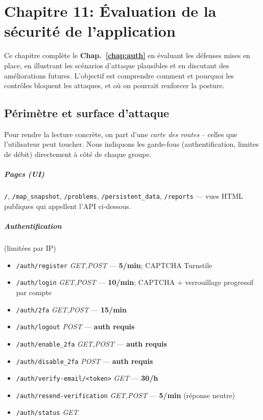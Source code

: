 \chapter{Chapitre 11: Évaluation de la sécurité de l'application}\label{chap:security}

\noindent Ce chapitre complète le \textbf{Chap.~\ref{chap:auth}} en évaluant les défenses mises en place, en illustrant les scénarios d'attaque plausibles et en discutant des améliorations futures. L'objectif est comprendre comment et pourquoi les contrôles bloquent les attaques, et où on pourrait renforcer la posture.

\section{Périmètre et surface d'attaque}
\noindent Pour rendre la lecture concrète, on part d'une \emph{carte des routes} – celles que l'utilisateur peut toucher. Nous indiquons les garde-fous (authentification, limites de débit) directement à côté de chaque groupe.

\paragraph{Pages (UI)} \texttt{/}, \texttt{/map\_snapshot}, \texttt{/problems}, \texttt{/persistent\_data}, \texttt{/reports} — vues HTML publiques qui appellent l'API ci-dessous.

\paragraph{Authentification} (limitées par IP)
\begin{itemize}
  \item \texttt{/auth/register} \textit{GET,POST} — \textbf{5/min}; CAPTCHA Turnstile
  \item \texttt{/auth/login} \textit{GET,POST} — \textbf{10/min}; CAPTCHA + verrouillage progressif par compte
  \item \texttt{/auth/2fa} \textit{GET,POST} — \textbf{15/min}
  \item \texttt{/auth/logout} \textit{POST} — \textbf{auth requis}
  \item \texttt{/auth/enable\_2fa} \textit{GET,POST} — \textbf{auth requis}
  \item \texttt{/auth/disable\_2fa} \textit{POST} — \textbf{auth requis}
  \item \texttt{/auth/verify-email/<token>} \textit{GET} — \textbf{30/h}
  \item \texttt{/auth/resend-verification} \textit{GET,POST} — \textbf{5/min} (réponse neutre)
  \item \texttt{/auth/status} \textit{GET}
\end{itemize}

